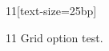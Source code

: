 \documentclass[paper=A4]{ropas-poster}
\begin{document}
\begin{postergrid}{1}{1}[text-size=25bp]
\begin{posterblock}{1}{1}
Grid option test.
\end{posterblock}
\end{postergrid}
\end{document}
